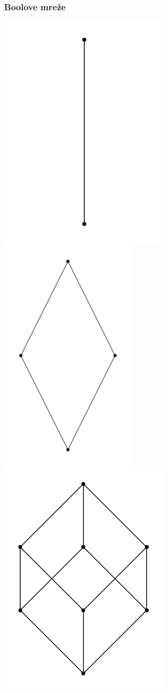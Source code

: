 \documentclass[slovene]{beamer}
\begin{document}
\begin{frame}
\frametitle{Boolove mreže}
\includegraphics[scale=0.2]{bool1}
\includegraphics[scale=0.2]{bool2}
\includegraphics[scale=0.2]{bool3}

\end{frame}
\end{document}
